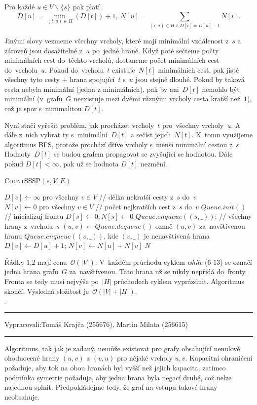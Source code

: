 \documentclass[12pt]{article}
\newcommand{\la}{\leftarrow}
\renewcommand{\O}{\mathcal{O}}
\newcommand{\zadani}[2]{
{\large
\noindent {\bf IB108 \hfill{} Sada #1, Příklad #2 \\[-4mm]}
\noindent\hrule
\vspace{2mm}
\noindent Vypracovali:\hfill{}Tomáš Krajča (255676), Martin Milata (256615)
\vspace{3mm}
\hrule
\bigskip\bigskip}
}
\begin{document}
\noindent
Pro každé $u \in V \smallsetminus \{s\}$ pak platí
$$ D[u] = \min_{(t,u) \in H}(D[t])+1,~N[u] = \sum_{(i,u) \in H \wedge D[i] = D[u]-1} N[i].$$

\noindent
Jinými slovy vezmeme všechny vrcholy, které mají minimální vzdálenost z~$s$ a
zároveň jsou dosažitelné z~$u$ po~jedné hraně. Když poté sečteme počty
minimálních cest do~těchto vrcholů, dostaneme počet minimálních cest do~vrcholu~$u$. Pokud do~vrcholu~$t$ existuje~$N[t]$ minimálních cest, pak jistě všechny
tyto cesty + hrana spojující~$t$ s~$u$ jsou stejně dlouhé. Pokud by taková cesta
nebyla minimální (jedna z minimálních), pak by ani~$D[t]$ nemohlo být minimální
(v~grafu~$G$ neexistuje mezi dvěmi různými vrcholy cesta kratší než~$1$), což je
spor s~minimalitou $D[t]$.

\noindent
Nyní stačí vyřešit problém, jak procházet vrcholy~$t$ pro~všechny vrcholy~$u$. A dále z~nich vybrat ty s~minimální~$D[t]$ a sečíst jejich~$N[t]$. K~tomu
využijeme algoritmus \textsc{BFS}, protože prochází dříve vrcholy s~menší
minimální cestou z~$s$. Hodnoty~$D[t]$ se budou grafem propagovat se
zvyšující se hodnotou. Dále pokud $D[t] < \infty$, pak už se hodnota $D[t]$ nezmění.

\begin{algorithm}
\textsc{CountSSSP}$(s, V, E)$
\begin{algorithmic}[1]
\STATE $D[v] \la \infty \mbox{ pro všechny } v \in V$ // délka nekratší cesty z~$s$ do~$v$
\STATE $N[v] \la 0 \mbox{ pro všechny } v \in V$ // počet nejkratších cest z~$s$ do~$v$
\STATE $Queue.init()$ // inicializuj frontu
\STATE $D[s] \la 0; N[s] \la 0$
\STATE $Queue.enqueue((s,\_))$; // všechny hrany z~vrcholu~$s$
\STATE $(u,v) \la Queue.dequeue()$
\STATE označ $(u,v)$ za~navštívenou hranu
\STATE $Queue.enqueue((v,\_)) \mbox{, kde } (v,\_)$ je nenavštívená hrana
\STATE $D[v] \la D[u]+1$; $N[v] \la N[u] + N[v]$
\ENDIF
\ENDWHILE
\RETURN $N$
\end{algorithmic}
\end{algorithm}
Řádky $1$,$2$ mají cenu~$\O(|V|)$. V~každém průchodu cyklem
\textit{while} ($6$-$13$) se označí jedna hrana grafu~$G$ za~navštívenou. Tato
hrana už se nikdy nepřidá do~fronty. Fronta se tedy musí nejvýše po~$|H|$
průchodech cyklem vyprázdnit. Algoritmus skončí. Výsledná složitost je~$\O(|V|+|H|)$.

\hfill$\square$

\clearpage
\zadani{3}{3}

\noindent
Algoritmus, tak jak je zadaný, nemůže existovat pro grafy obsahující nenulově ohodnocené hrany $(u,v)$
a $(v,u)$ pro nějaké vrcholy $u,v$. Kapacitní ohraničení požaduje, aby tok na obou hranách byl vyšší než
jejich kapacita, zatímco podmínka symetrie požaduje, aby jedna hrana byla negací druhé, což nelze
najednou splnit. Předpokládejme tedy, že graf na vstupu takové hrany neobsahuje.
\end{document}
